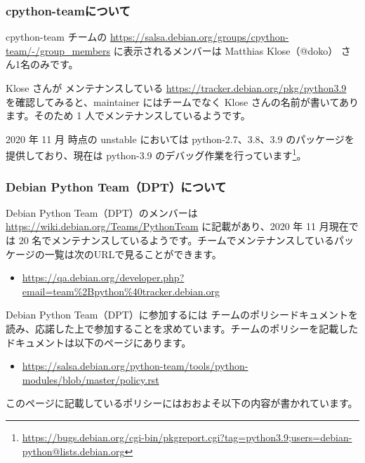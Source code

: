 \documentclass[mingoth,a4paper]{jsarticle}
\begin{document}
\subsubsection{cpython-teamについて}

cpython-team チームの \url{https://salsa.debian.org/groups/cpython-team/-/group_members} に表示されるメンバーは Matthias Klose（@doko） さん1名のみです。

Klose さんが メンテナンスしている \url{https://tracker.debian.org/pkg/python3.9} を確認してみると、maintainer にはチームでなく Klose さんの名前が書いてあります。そのため 1 人でメンテナンスしているようです。

2020 年 11 月 時点の unstable においては python-2.7、3.8、3.9 のパッケージを提供しており、現在は python-3.9 のデバッグ作業を行っています\footnote{\url{https://bugs.debian.org/cgi-bin/pkgreport.cgi?tag=python3.9;users=debian-python@lists.debian.org}}。


\subsubsection{Debian Python Team（DPT）について}

Debian Python Team（DPT）のメンバーは \url{https://wiki.debian.org/Teams/PythonTeam} に記載があり、2020 年 11 月現在では 20 名でメンテナンスしているようです。チームでメンテナンスしているパッケージの一覧は次のURLで見ることができます。

\begin{itemize}
\item \url{https://qa.debian.org/developer.php?email=team%2Bpython%40tracker.debian.org}
\end{itemize}  


Debian Python Team（DPT）に参加するには チームのポリシードキュメントを読み、応諾した上で参加することを求めています。チームのポリシーを記載したドキュメントは以下のページにあります。

\begin{itemize}
\item \url{https://salsa.debian.org/python-team/tools/python-modules/blob/master/policy.rst}
\end{itemize}  

このページに記載しているポリシーにはおおよそ以下の内容が書かれています。
\end{document}
